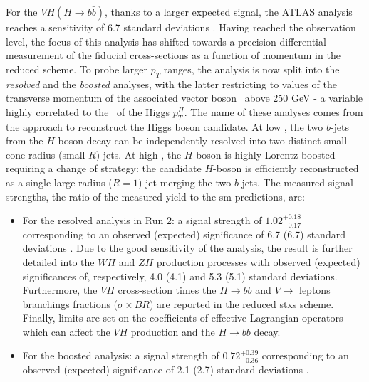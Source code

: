 For the $VH (H\rightarrow b\bar{b})$, thanks to a larger expected signal, the ATLAS analysis reaches a sensitivity of 6.7 standard deviations \cite{ATLAS:2020fcp}. Having reached the observation level, the focus of this analysis has shifted towards a precision differential measurement of the fiducial cross-sections as a function of momentum in the reduced  scheme. To probe larger $p_T$ ranges, the analysis is now split into the \textit{resolved} \cite{ATLAS:2020fcp} and the \textit{boosted} \cite{ATLAS:2020jwz} analyses, with the latter restricting to values of the transverse momentum of the associated vector boson \ptv\ above 250 GeV - a variable highly correlated to the \pt\ of the Higgs $p_T^H$. The name of these analyses comes from the approach to reconstruct the Higgs boson candidate. At low \ptv, the two $b$-jets from the $H$-boson decay can be independently resolved into two distinct small cone radius (small-$R$) jets. At high \ptv, the $H$-boson is highly Lorentz-boosted requiring a change of strategy: the candidate $H$-boson is efficiently reconstructed as a single large-radius ($R = 1$) jet merging the two $b$-jets. The measured signal strengths, the ratio of the measured yield to the \gls{sm} predictions, are: 
\begin{itemize}
\item For the resolved analysis in Run 2: a signal strength of $1.02_{-0.17}^{+0.18}$ corresponding to an observed (expected) significance of 6.7 (6.7) standard deviations \cite{ATLAS:2020fcp}. Due to the good sensitivity of the analysis, the result is further detailed into the $WH$ and $ZH$ production processes with observed (expected) significances of, respectively, 4.0 (4.1) and 5.3 (5.1) standard deviations. Furthermore, the $VH$ cross-section times the $H \rightarrow b\bar{b}$ and $V\rightarrow$ leptons branchings fractions ($\sigma \times BR$) are reported in the reduced \gls{stxs} scheme. Finally, limits are set on the coefficients of effective Lagrangian operators which can affect the $VH$ production and the $H \rightarrow b\bar{b}$ decay.
\item For the boosted analysis: a signal strength of  $0.72_{-0.36}^{+0.39}$ corresponding to an observed (expected) significance of 2.1 (2.7) standard deviations \cite{ATLAS:2020jwz}.
\end{itemize}

